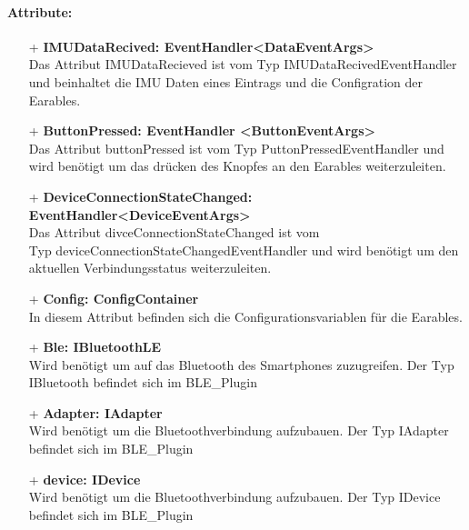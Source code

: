 \documentclass[a4paper,12pt]{article}
\begin{document}
\paragraph{Attribute:}
\begin{itemize}
	\item[+] \textbf{IMUDataRecived: EventHandler<DataEventArgs>}\\Das Attribut IMUDataRecieved ist vom Typ IMUDataRecivedEventHandler und beinhaltet die IMU Daten eines Eintrags und die Configration der Earables.
	\item[+] \textbf{ButtonPressed: EventHandler <ButtonEventArgs>}\\ Das Attribut buttonPressed ist vom Typ PuttonPressedEventHandler und wird benötigt um das drücken des Knopfes an den Earables weiterzuleiten.
	\item[+] \textbf{DeviceConnectionStateChanged: EventHandler<DeviceEventArgs>}\\ Das Attribut divceConnectionStateChanged ist vom \\Typ deviceConnectionStateChangedEventHandler und wird benötigt um den aktuellen Verbindungsstatus weiterzuleiten.
	\item[+] \textbf{Config: ConfigContainer}\\ In diesem Attribut befinden sich die Configurationsvariablen für die Earables.
	\item[+] \textbf{Ble: IBluetoothLE}\\ Wird benötigt um auf das Bluetooth des Smartphones zuzugreifen. Der Typ IBluetooth befindet sich im BLE\_Plugin
	\item[+] \textbf{Adapter: IAdapter}\\ Wird benötigt um die Bluetoothverbindung aufzubauen. Der Typ  IAdapter befindet sich im BLE\_Plugin
	\item[+] \textbf{device: IDevice}\\ Wird benötigt um die Bluetoothverbindung aufzubauen. Der Typ  IDevice befindet sich im BLE\_Plugin
\end{itemize}
\end{document}
